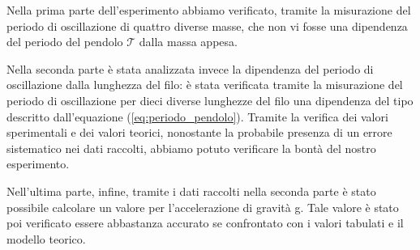 Nella prima parte dell'esperimento abbiamo verificato, tramite la misurazione del periodo di oscillazione di quattro diverse masse, che non vi fosse una dipendenza del periodo del pendolo $\mathcal{T}$ dalla massa appesa.

Nella seconda parte è stata analizzata invece la dipendenza del periodo di oscillazione dalla lunghezza del filo: è stata verificata tramite la misurazione del periodo di oscillazione per dieci diverse lunghezze del filo una dipendenza del tipo descritto dall'equazione (\ref{eq:periodo_pendolo}). Tramite la verifica dei valori sperimentali e dei valori teorici, nonostante la probabile presenza di un errore sistematico nei dati raccolti, abbiamo potuto verificare la bontà del nostro esperimento.

Nell'ultima parte, infine, tramite i dati raccolti nella seconda parte è stato possibile calcolare un valore per l'accelerazione di gravità g. Tale valore è stato poi verificato essere abbastanza accurato se confrontato con i valori tabulati e il modello teorico.